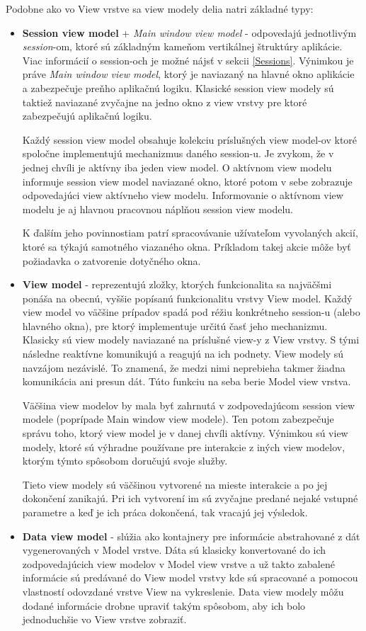 Podobne ako vo View vrstve sa view modely delia natri základné typy:
\begin{itemize}
    \item \textbf{Session view model} + \textit{Main window view model} - odpovedajú jednotlivým \textit{session}-om, ktoré sú základným kameňom vertikálnej štruktúry aplikácie. Viac informácií o session-och je možné nájsť v sekcii \ref{Sessions}. Výnimkou je práve \textit{Main window view model}, ktorý je naviazaný na hlavné okno aplikácie a zabezpečuje preňho aplikačnú logiku. Klasické session view modely sú taktiež naviazané zvyčajne na jedno okno z view vrstvy pre ktoré zabezpečujú aplikačnú logiku.
    
    Každý session view model obsahuje kolekciu príslušných view model-ov ktoré spoločne implementujú mechanizmus daného session-u. Je zvykom, že v jednej chvíli je aktívny iba jeden view model. O aktívnom view modelu informuje session view model naviazané okno, ktoré potom v sebe zobrazuje odpovedajúci view aktívneho view modelu. Informovanie o aktívnom view modelu je aj hlavnou pracovnou náplňou session view modelu.

    K ďalším jeho povinnostiam patrí spracovávanie užívateľom vyvolaných akcií, ktoré sa týkajú samotného viazaného okna. Príkladom takej akcie môže byť požiadavka o zatvorenie dotyčného okna.
    \item \textbf{View model} - reprezentujú zložky, ktorých funkcionalita sa najväčšmi ponáša na obecnú, vyššie popísanú funkcionalitu vrstvy View model. Každý view model vo väčšine prípadov spadá pod réžiu konkrétneho session-u (alebo hlavného okna), pre ktorý implementuje určitú časť jeho mechanizmu. Klasicky sú view modely naviazané na príslušné view-y z View vrstvy. S tými následne reaktívne komunikujú a reagujú na ich podnety. View modely sú navzájom nezávislé. To znamená, že medzi nimi neprebieha takmer žiadna komunikácia ani presun dát. Túto funkciu na seba berie Model view vrstva.

    Väčšina view modelov by mala byť zahrnutá v zodpovedajúcom session view modele (poprípade Main window view modele). Ten potom zabezpečuje správu toho, ktorý view model je v danej chvíli aktívny. Výnimkou sú view modely, ktoré sú výhradne používane pre interakcie z iných view modelov, ktorým týmto spôsobom doručujú svoje služby. 
    
    Tieto view modely sú väčšinou vytvorené na mieste interakcie a po jej dokončení zanikajú. Pri ich vytvorení im sú zvyčajne predané nejaké vstupné parametre a keď je ich práca dokončená, tak vracajú jej výsledok.
    \item \textbf{Data view model} - slúžia ako kontajnery pre informácie abstrahované z dát vygenerovaných v Model vrstve. Dáta sú klasicky konvertované do ich zodpovedajúcich view modelov v Model view vrstve a už takto zabalené informácie sú predávané do View model vrstvy kde sú spracované a pomocou vlastností odovzdané vrstve View na vykreslenie. Data view modely môžu dodané informácie drobne upraviť takým spôsobom, aby ich bolo jednoduchšie vo View vrstve zobraziť.
    

\end{itemize}
